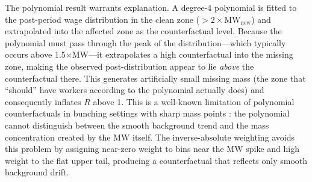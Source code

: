 \documentclass[12pt]{article}
\begin{document}
The polynomial result warrants explanation. A degree-4 polynomial is fitted to the post-period wage distribution in the clean zone ($> 2 \times \text{MW}_\text{new}$) and extrapolated into the affected zone as the counterfactual level. Because the polynomial must pass through the peak of the distribution---which typically occurs above 1.5$\times$MW---it extrapolates a high counterfactual into the missing zone, making the observed post-distribution appear to lie \textit{above} the counterfactual there. This generates artificially small missing mass (the zone that ``should'' have workers according to the polynomial actually does) and consequently inflates $R$ above 1. This is a well-known limitation of polynomial counterfactuals in bunching settings with sharp mass points \citep{kleven2013}: the polynomial cannot distinguish between the smooth background trend and the mass concentration created by the MW itself. The inverse-absolute weighting avoids this problem by assigning near-zero weight to bins near the MW spike and high weight to the flat upper tail, producing a counterfactual that reflects only smooth background drift.
\end{document}
